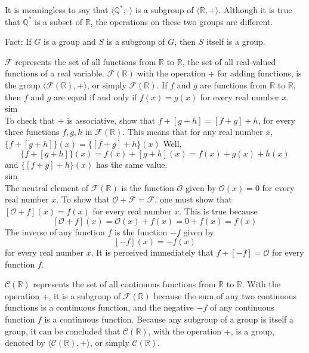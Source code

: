 \documentclass[12pt]{article}
\newcommand{\group}[2]{\langle #1, #2 \rangle}
\newcommand{\nonzerorationals}{\mathds{Q}^*}
\newcommand{\reals}{\mathds{R}}
\begin{document}
\begin{example} It is meaningless to say that $\group{\nonzerorationals}{\cdot}$ is a subgroup of $\group{\reals}{+}$. Although it is true that $\nonzerorationals$ is a subset of $\reals$, the operations on these two groups are different. \end{example} 

Fact: If $G$ is a group and $S$ is a subgroup of $G$, then $S$ itself is a group. 

\begin{example} $\mathscr{F}$ represents the set of all functions from $\reals$ to $\reals$, the set of all real-valued functions of a real variable. $\mathscr{F}(\reals)$ with the operation + for adding functions, is the group $\group{\mathscr{F}(\reals)}{+}$, or simply $\mathscr{F}(\reals)$. If $f$ and $g$ are functions from $\reals$ to $\reals$, then $f$ and $g$ are equal if and only if $f(x) = g(x)$ for every real number $x$. \\sim\\ To check that + is associative, show that $f + [g + h] = [f + g] + h$, for every three functions $f, g, h$ in $\mathscr{F}(\reals)$. This means that for any real number $x$, 
$\{f + [g + h]\}(x) = \{[f + g] + h\}(x)$ Well, 
$$\{f + [g + h]\}(x) = f(x) + [g + h](x) = f(x) + g(x) + h(x) $$ and $\{[f + g] + h\}(x)$ has the same value. \\sim\\
The neutral element of $\mathscr{F}(\reals)$ is the function $\mathscr{O}$ given by $\mathscr{O}(x) = 0$ for every real number $x$. To show that $\mathscr{O} + \mathscr{F} = \mathscr{F}$, one must show that $[\mathscr{O} + f](x) = f(x)$ for every real number $x$. This is true because $$[\mathscr{O} + f](x) = \mathscr{O}(x) + f(x) = 0 + f(x) = f(x)$$ 
The inverse of any function $f$ is the function $-f$ given by $$[-f](x) = -f(x)$$ for every real number $x$. It is perceived immediately that $f + [-f] = \mathscr{O}$ for every function $f$. \end{example} 

\begin{example} $\mathscr{C}(\reals)$ represents the set of all continuous functions from $\reals$ to $\reals$. With the operation +, it is a subgroup of $\mathscr{F}(\reals)$ because the sum of any two continuous functions is a continuous function, and the negative $-f$ of any continuous function $f$ is a continuous function. Because any subgroup of a group is itself a group, it can be concluded that $\mathscr{C}(\reals)$, with the operation +, is a group, denoted by $\group{\mathscr{C}(\reals)}{+}$, or simply $\mathscr{C}(\reals)$. \end{example} 
\end{document}
